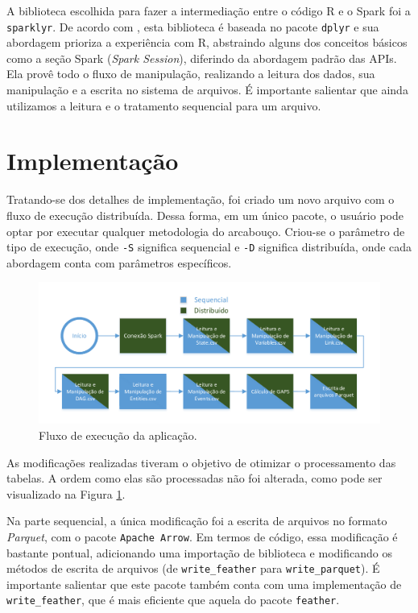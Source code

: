 A biblioteca escolhida para fazer a intermediação entre o código R e o Spark 
foi a \texttt{sparklyr}. De acordo com \citet{ref:sparkbook}, esta biblioteca é 
baseada no pacote \texttt{dplyr} e sua abordagem prioriza a experiência com R, 
abstraindo alguns dos conceitos básicos como a seção Spark (\emph{Spark 
Session}), diferindo da abordagem padrão das APIs. Ela provê todo o fluxo de 
manipulação, realizando a leitura dos dados, sua manipulação e a escrita no 
sistema de arquivos. É importante salientar que ainda utilizamos a leitura e o 
tratamento sequencial para um arquivo.


\section{Implementação} \label{sect:implement}

Tratando-se dos detalhes de implementação, foi criado um novo arquivo com o 
fluxo de execução distribuída. Dessa forma, em um único pacote, o usuário pode 
optar por executar qualquer metodologia do arcabouço. Criou-se o parâmetro de 
tipo de execução, onde \texttt{-S} significa sequencial e \texttt{-D} significa 
distribuída, onde cada abordagem conta com parâmetros específicos.

\begin{figure}[ht]
 \centerline{\includegraphics[width=1\textwidth]{./img/applicationflow.pdf}}
 \caption{Fluxo de execução da aplicação.}
 \label{fig:spark-starvz-flow}
\end{figure}

As modificações realizadas tiveram o objetivo de otimizar o processamento das 
tabelas. A ordem como elas são processadas não foi alterada, como pode ser 
visualizado na Figura \ref{fig:spark-starvz-flow}.

Na parte sequencial, a única modificação foi a escrita de arquivos no formato 
\textit{Parquet}, com o pacote \texttt{Apache Arrow}. Em termos de código, essa 
modificação é bastante pontual, adicionando uma importação de biblioteca e 
modificando os métodos de escrita de arquivos (de \texttt{write\_feather} 
para \texttt{write\_parquet}). É importante salientar que este pacote também 
conta com uma implementação de \texttt{write\_feather}, que é mais eficiente 
que aquela do pacote \texttt{feather}.

